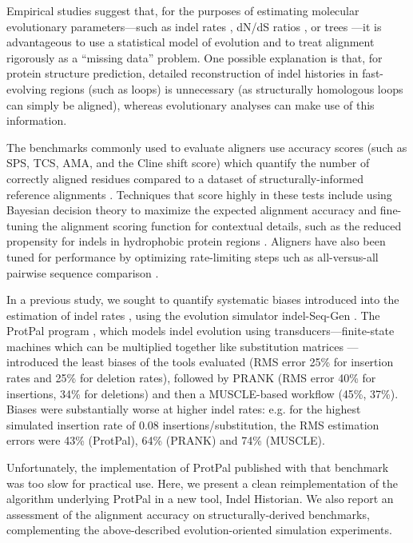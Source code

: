 \documentclass{bioinfo}
\begin{document}
Empirical studies suggest that, for the purposes of estimating
molecular evolutionary parameters---such as indel rates \citep{Westesson2012-zg},
dN/dS ratios \citep{Redelings2014},
or trees \citep{LoytynojaGoldman2008}---it is advantageous to use a statistical model of evolution
and to treat alignment rigorously as a ``missing data'' problem.
One possible explanation is that, for protein structure prediction,
detailed reconstruction of indel histories in fast-evolving regions (such as loops) is unnecessary
(as structurally homologous loops can simply be aligned),
whereas evolutionary analyses can make use of this information.

The benchmarks commonly used to evaluate aligners use accuracy scores
(such as SPS, TCS, AMA, and the Cline shift score)
which quantify the number of correctly aligned residues
compared to a dataset of structurally-informed reference alignments \citep{ThompsonEtAl2005}.
Techniques that score highly in these tests include using Bayesian decision theory to maximize the expected
alignment accuracy \citep{NotredameEtAl2000,DoEtAl2005,SchwartzPachter2007,BradleyEtAl2009}
and fine-tuning the alignment scoring function for contextual details, such as the reduced propensity for indels in
hydrophobic protein regions \citep{Edgar2004b,KatohEtAl2005,LarkinEtAl2007}.
Aligners have also been tuned for performance by optimizing rate-limiting steps
uch as all-versus-all pairwise sequence comparison \citep{Edgar2004b,BradleyEtAl2009}.

In a previous study, we sought to quantify systematic biases introduced into the
estimation of indel rates \citep{Westesson2012-zg},
using the evolution simulator indel-Seq-Gen \citep{StropeEtAl2009}.
The ProtPal program \citep{Westesson2012-zg}, which models indel evolution using 
transducers---finite-state machines which can be multiplied together like substitution matrices \citep{BouchardCote2013}---introduced
the least biases of the tools evaluated (RMS error 25\% for insertion rates and 25\% for deletion rates),
followed by PRANK (RMS error 40\% for insertions, 34\% for deletions) and then a MUSCLE-based workflow (45\%, 37\%).
Biases were substantially worse at higher indel rates: e.g. for the highest simulated insertion rate of 0.08 insertions/substitution,
the RMS estimation errors were 43\% (ProtPal), 64\% (PRANK) and 74\% (MUSCLE).

Unfortunately, the implementation of ProtPal published with that benchmark was too slow
for practical use.
Here, we present a clean reimplementation of the algorithm underlying ProtPal
in a new tool, Indel Historian.
We also report an assessment of the alignment accuracy
on structurally-derived benchmarks,
complementing the above-described evolution-oriented simulation experiments.
\end{document}
